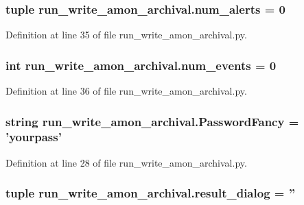\hypertarget{namespacerun__write__amon__archival_a581cb7e60aab57263c785d923a66031f}{
\subsubsection[{num\-\_\-alerts}]{\setlength{\rightskip}{0pt plus 5cm}tuple run\-\_\-write\-\_\-amon\-\_\-archival.\-num\-\_\-alerts = 0}}\label{namespacerun__write__amon__archival_a581cb7e60aab57263c785d923a66031f}


Definition at line 35 of file run\-\_\-write\-\_\-amon\-\_\-archival.\-py.

\hypertarget{namespacerun__write__amon__archival_a722c615f2684475c26e7d0421bf0b13c}{
\subsubsection[{num\-\_\-events}]{\setlength{\rightskip}{0pt plus 5cm}int run\-\_\-write\-\_\-amon\-\_\-archival.\-num\-\_\-events = 0}}\label{namespacerun__write__amon__archival_a722c615f2684475c26e7d0421bf0b13c}


Definition at line 36 of file run\-\_\-write\-\_\-amon\-\_\-archival.\-py.

\hypertarget{namespacerun__write__amon__archival_a6d8f0d476b812d8f56f07ad64bed30bc}{
\subsubsection[{Password\-Fancy}]{\setlength{\rightskip}{0pt plus 5cm}string run\-\_\-write\-\_\-amon\-\_\-archival.\-Password\-Fancy = 'yourpass'}}\label{namespacerun__write__amon__archival_a6d8f0d476b812d8f56f07ad64bed30bc}


Definition at line 28 of file run\-\_\-write\-\_\-amon\-\_\-archival.\-py.

\hypertarget{namespacerun__write__amon__archival_ad76510cc1b9a03179b91e7092dc7ae00}{
\subsubsection[{result\-\_\-dialog}]{\setlength{\rightskip}{0pt plus 5cm}tuple run\-\_\-write\-\_\-amon\-\_\-archival.\-result\-\_\-dialog = ''}}\label{namespacerun__write__amon__archival_ad76510cc1b9a03179b91e7092dc7ae00}


